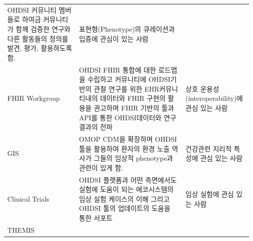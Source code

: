 \documentclass[11pt]{book}
\theoremstyle{definition}
\theoremstyle{definition}
\theoremstyle{definition}
\theoremstyle{remark}
\begin{document}
\begin{longtable}[]{@{}lll@{}}
\begin{minipage}[t]{0.30\columnwidth}
OHDSI 커뮤니티 멤버들로 하여금 커뮤니티가 함께 검증한 연구와 다른
활동들의 정의를 발견, 평가, 활용하도록 함.\strut
\end{minipage} & \begin{minipage}[t]{0.15\columnwidth}\raggedright\strut
표현형(Phenotype)의 큐레이션과 입증에 관심이 있는 사람\strut
\end{minipage}\tabularnewline
\begin{minipage}[t]{0.11\columnwidth}\raggedright\strut
FHIR Workgroup\strut
\end{minipage} & \begin{minipage}[t]{0.30\columnwidth}\raggedright\strut
OHDSI FHIR 통합에 대한 로드맵을 수립하고 커뮤니티에 OHDSI기반의 관찰
연구를 위한 EHR커뮤니티내의 데이터와 FHIR 구현의 활용을 권고하며 FHIR
기반의 툴과 API를 통한 OHDSI데이터와 연구 결과의 전파\strut
\end{minipage} & \begin{minipage}[t]{0.15\columnwidth}\raggedright\strut
상호 운용성(interoperability)에 관심 있는 사람\strut
\end{minipage}\tabularnewline
\begin{minipage}[t]{0.11\columnwidth}\raggedright\strut
GIS\strut
\end{minipage} & \begin{minipage}[t]{0.30\columnwidth}\raggedright\strut
OMOP CDM을 확장하며 OHDSI툴을 활용하여 환자의 환경 노출 역사가 그들의
임상적 phenotype과 관련이 있게 함.\strut
\end{minipage} & \begin{minipage}[t]{0.15\columnwidth}\raggedright\strut
건강관련 지리적 특성에 관심 있는 사람\strut
\end{minipage}\tabularnewline
\begin{minipage}[t]{0.11\columnwidth}\raggedright\strut
Clinical Trials\strut
\end{minipage} & \begin{minipage}[t]{0.30\columnwidth}\raggedright\strut
OHDSI 플랫폼과 어떤 측면에서도 실험에 도움이 되는 에코시스템의 임상 실험
케이스의 이해 그리고 OHDSI 툴의 업데이트의 도움을 통한 서포트\strut
\end{minipage} & \begin{minipage}[t]{0.15\columnwidth}\raggedright\strut
임상 실험에 관심 있는 사람\strut
\end{minipage}\tabularnewline
\begin{minipage}[t]{0.11\columnwidth}\raggedright\strut
THEMIS\strut
\end{minipage} & \begin{minipage}[t]{0.30\columnwidth}\raggedright\strut

\end{minipage}
\end{longtable}
\end{document}
